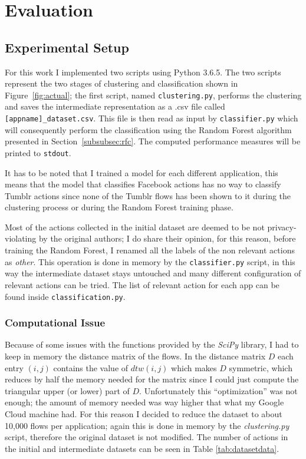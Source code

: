 \section{Evaluation}
\label{sec:eval}
\subsection{Experimental Setup}
For this work I implemented two scripts using Python 3.6.5. The two scripts represent the two stages of clustering and classification shown in Figure~\ref{fig:actual}; the first script, named \texttt{clustering.py}, performs the clustering and saves the intermediate representation as a .csv file called \texttt{[appname]\_dataset.csv}. This file is then read as input by \texttt{classifier.py} which will consequently perform the classification using the Random Forest algorithm presented in Section~\ref{subsubsec:rfc}. The computed performance measures will be printed to \texttt{stdout}.

It has to be noted that I trained a model for each different application, this means that the model that classifies Facebook actions has no way to classify Tumblr actions since none of the Tumblr flows has been shown to it during the clustering process or during the Random Forest training phase.

Most of the actions collected in the initial dataset are deemed to be not privacy-violating by the original authors; I do share their opinion, for this reason, before training the Random Forest, I renamed all the labels of the non relevant actions as \textit{other}. This operation is done in memory by the \texttt{classifier.py} script, in this way the intermediate dataset stays untouched and many different configuration of relevant actions can be tried. The list of relevant action for each app can be found inside \texttt{classification.py}.


\subsubsection{Computational Issue}
Because of some issues with the functions provided by the \textit{SciPy} library, I had to keep in memory the distance matrix of the flows. In the distance matrix $D$ each entry $(i,j)$ contains the value of $dtw(i, j)$ which makes $D$ symmetric, which reduces by half the memory needed for the matrix since I could just compute the triangular upper (or lower) part of $D$. Unfortunately this ``optimization'' was not enough; the amount of memory needed was way higher that what my Google Cloud machine had. For this reason I decided to reduce the dataset to about 10,000 flows per application; again this is done in memory by the \textit{clustering.py} script, therefore the original dataset is not modified. The number of actions in the initial and intermediate datasets can be seen in Table \ref{tab:datasetdata}.


